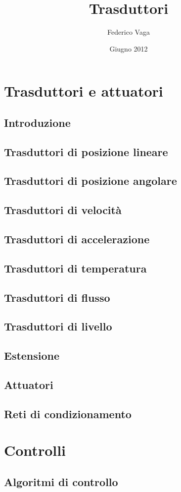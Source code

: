 \documentclass[a4paper,10pt]{book}
\title{Trasduttori}
\author{Federico Vaga}
\date{Giugno 2012}
\begin{document}


\tableofcontents
\listoffigures

\part{Trasduttori e attuatori}
\chapter{Introduzione}

\chapter{Trasduttori di posizione lineare}

\chapter{Trasduttori di posizione angolare}

\chapter{Trasduttori di velocità}

\chapter{Trasduttori di accelerazione}

\chapter{Trasduttori di temperatura}

\chapter{Trasduttori di flusso}

\chapter{Trasduttori di livello}

\chapter{Estensione}

\chapter{Attuatori}

\chapter{Reti di condizionamento}

\part{Controlli}
\chapter{Algoritmi di controllo}

\end{document}
